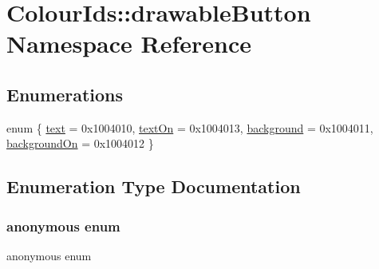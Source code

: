 \hypertarget{namespaceColourIds_1_1drawableButton}{}\section{Colour\+Ids\+:\+:drawable\+Button Namespace Reference}
\label{namespaceColourIds_1_1drawableButton}
\subsection*{Enumerations}
\begin{DoxyCompactItemize}
\item 
enum \{ \mbox{\hyperlink{namespaceColourIds_1_1drawableButton_a1f646ec1c85ba1845eac3e7fe39f9ff1a895eda901bfb2340588a4b6be68e2dd8}{text}} = 0x1004010, 
\mbox{\hyperlink{namespaceColourIds_1_1drawableButton_a1f646ec1c85ba1845eac3e7fe39f9ff1ae610f99dc719e8e95804694902f6fa8f}{text\+On}} = 0x1004013, 
\mbox{\hyperlink{namespaceColourIds_1_1drawableButton_a1f646ec1c85ba1845eac3e7fe39f9ff1aa23508a67ffc8a811fa83e06a12d180d}{background}} = 0x1004011, 
\mbox{\hyperlink{namespaceColourIds_1_1drawableButton_a1f646ec1c85ba1845eac3e7fe39f9ff1a2b7db16529a7e6ce83d271a455f3a8bc}{background\+On}} = 0x1004012
 \}
\end{DoxyCompactItemize}


\subsection{Enumeration Type Documentation}
\mbox{\label{namespaceColourIds_1_1drawableButton_a1f646ec1c85ba1845eac3e7fe39f9ff1}} 
\subsubsection{\texorpdfstring{anonymous enum}{anonymous enum}}
{\footnotesize\ttfamily anonymous enum}

